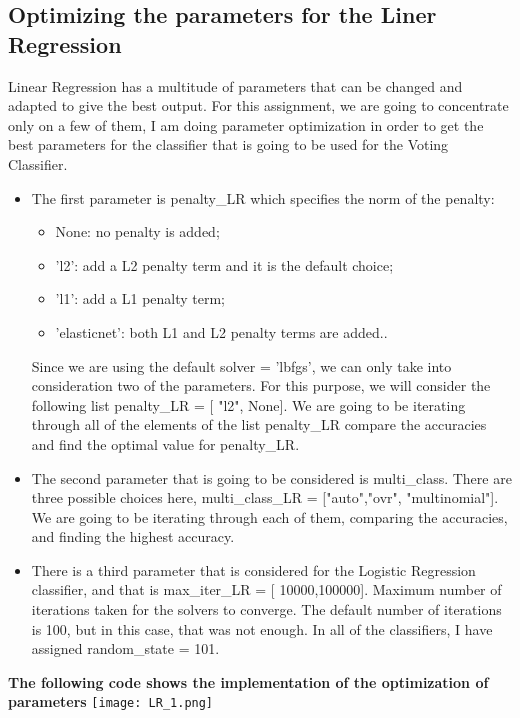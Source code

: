 \documentclass{article}
\begin{document}
 \subsection{Optimizing the parameters for the Liner Regression}
Linear Regression has a multitude of parameters that can be changed and adapted to give the best output. For this assignment, we are going to concentrate only on a few of them, I am doing parameter optimization in order to get the best parameters for the classifier that is going to be used for the Voting Classifier. 
\begin{itemize}
    \item The first parameter is penalty\_LR which specifies the norm of the penalty: 
    \begin{itemize}
        \item None: no penalty is added;
        \item 'l2': add a L2 penalty term and it is the default choice;
        \item 'l1': add a L1 penalty term;
        \item 'elasticnet': both L1 and L2 penalty terms are added.. 
        
    \end{itemize}
    Since we are using the default solver = 'lbfgs', we can only take into consideration two of the parameters. For this purpose, we will consider the following list penalty\_LR = [ "l2",  None]. We are going to be iterating through all of the elements of the list penalty\_LR compare the accuracies and find the optimal value for penalty\_LR. 
    \item The second parameter that is going to be considered is multi\_class. There are three possible choices here, multi\_class\_LR = ["auto","ovr", "multinomial"]. We are going to be iterating through each of them, comparing the accuracies, and finding the highest accuracy. 
    
    \item There is a third parameter that is considered for the Logistic Regression classifier, and that is max\_iter\_LR = [ 10000,100000]. Maximum number of iterations taken for the solvers to converge. The default number of iterations is 100, but in this case, that was not enough.  In all of the classifiers, I have assigned random\_state = 101.
\end{itemize}

\textbf{The following code shows the implementation of the optimization of parameters}
 \vspace{1cm}
 \centering
\texttt{[image: LR\_1.png]}
 \vspace{1cm}
\end{document}
